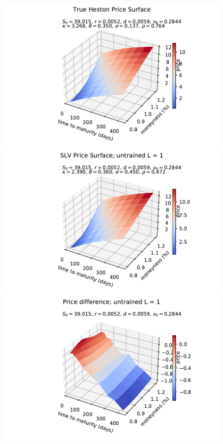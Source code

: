 \documentclass[
a4paper,     %
12pt           %
]{scrartcl}  %
\numberwithin{equation}{section}
\begin{document}
\begin{figure}
\begin{minipage}[Ausrichtung]{0.329\textwidth}
	\end{minipage}
	\begin{minipage}[Ausrichtung]{0.329\textwidth}
		\includegraphics[width=\textwidth]{fig/Psurf_orginal_2017-01-04}
	\end{minipage}
	\begin{minipage}[Ausrichtung]{0.329\textwidth}
		\includegraphics[width=\textwidth]{fig/Psurf_untrained_2017-01-04}
	\end{minipage}
	\begin{minipage}[Ausrichtung]{0.329\textwidth}
		\includegraphics[width=\textwidth]{fig/Psurf_untrained_diff_2017-01-04_rec_3lay_seed1}

\end{minipage}
\end{figure}
\end{document}
